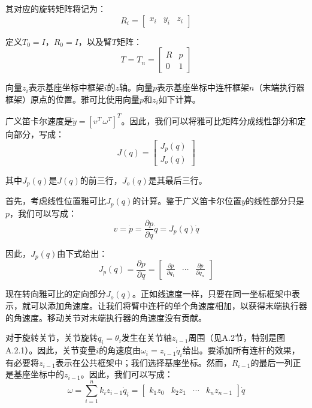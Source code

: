 \documentclass[UTF8,a4paper]{ctexart}
\begin{document}
其对应的旋转矩阵将记为：
\begin{equation}
R_i = \begin{bmatrix} x_i & y_i & z_i \end{bmatrix}
\tag{A.3.30}
\end{equation}

定义$T_0 = I$，$R_0 = I$，以及臂$T$矩阵：
\begin{equation}
T = T_n = \begin{bmatrix} R & p \\ 0 & 1 \end{bmatrix}
\tag{A.3.31}
\end{equation}

向量$z_i$表示基座坐标中框架$i$的$z$轴。向量$p$表示基座坐标中连杆框架$n$（末端执行器框架）原点的位置。雅可比使用向量$p$和$z_i$如下计算。

广义笛卡尔速度是$\dot{y} = [v^T \, \omega^T]^T$。因此，我们可以将雅可比矩阵分成线性部分和定向部分，写成：
\begin{equation}
J(q) = \begin{bmatrix} J_p(q) \\ J_o(q) \end{bmatrix}
\tag{A.3.32}
\end{equation}

其中$J_p(q)$是$J(q)$的前三行，$J_o(q)$是其最后三行。

首先，考虑线性位置雅可比$J_p(q)$的计算。鉴于广义笛卡尔位置$y$的线性部分只是$p$，我们可以写成：
\begin{equation}
v = \dot{p} = \frac{\partial p}{\partial q}\dot{q} = J_p(q)\dot{q}
\tag{A.3.33}
\end{equation}

因此，$J_p(q)$由下式给出：
\begin{equation}
J_p(q) = \frac{\partial p}{\partial q} = \begin{bmatrix} \frac{\partial p}{\partial q_1} & \cdots & \frac{\partial p}{\partial q_n} \end{bmatrix}
\tag{A.3.34}
\end{equation}

现在转向雅可比的定向部分$J_o(q)$。正如线速度一样，只要在同一坐标框架中表示，就可以添加角速度。让我们将臂中连杆的单个角速度相加，以获得末端执行器的角速度。移动关节对末端执行器的角速度没有贡献。

对于旋转关节，关节旋转$q_i = \theta_i$发生在关节轴$z_{i-1}$周围（见A.2节，特别是图A.2.1）。因此，关节变量$i$的角速度由$\omega_i = z_{i-1}\dot{q}_i$给出。要添加所有连杆的效果，有必要将$z_{i-1}$表示在公共框架中；我们选择基座坐标。然而，$R_{i-1}$的最后一列正是基座坐标中的$z_{i-1}$。因此，我们可以写成：
\begin{equation}
\omega = \sum_{i=1}^{n} k_i z_{i-1}\dot{q}_i = \begin{bmatrix} k_1z_0 & k_2z_1 & \cdots & k_nz_{n-1} \end{bmatrix} \dot{q}
\tag{A.3.35}
\end{equation}
\end{document}
